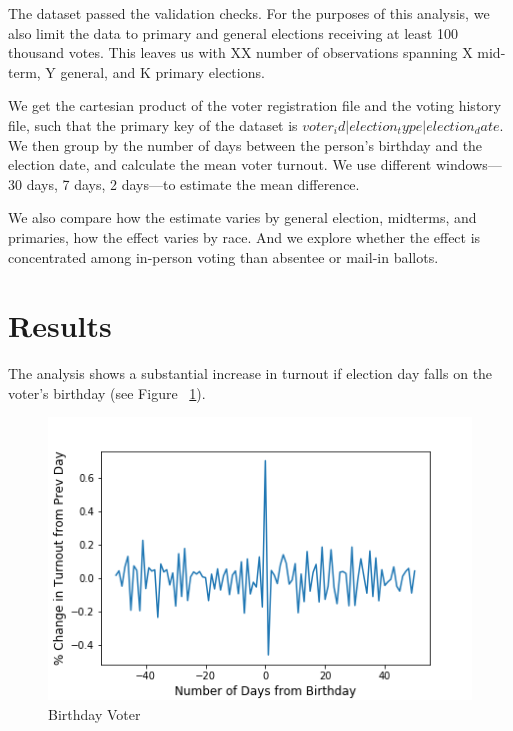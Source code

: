 \documentclass[12pt, letterpaper]{article}
\begin{document}
The dataset passed the validation checks. For the purposes of this analysis, we also limit the data to primary and general elections receiving at least 100 thousand votes. This leaves us with XX number of observations spanning X mid-term, Y general, and K primary elections. 






We get the cartesian product of the voter registration file and the voting history file, such that the primary key of the dataset is $voter_id | election_type | election_date$. We then group by the number of days between the person's birthday and the election date, and calculate the mean voter turnout. We use different windows---30 days, 7 days, 2 days---to estimate the mean difference.

We also compare how the estimate varies by general election, midterms, and primaries, how the effect varies by race. And we explore whether the effect is concentrated among in-person voting than absentee or mail-in ballots.

\section{Results}
The analysis shows a substantial increase in turnout if election day falls on the voter's birthday (see Figure ~\ref{fig:birthday}).

\begin{figure}[H]
\centering
 \includegraphics[scale=.7]{../figs/fig1_turnout_chg_from_prev_day.png}
 \caption{Birthday Voter}
 \label{fig:birthday}
\end{figure}




\end{document}
